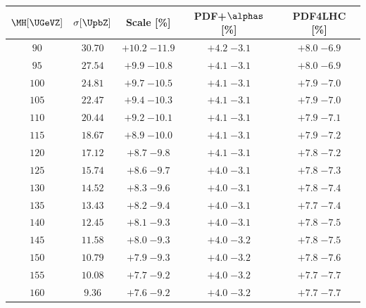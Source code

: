 \begin{table}

   \begin{center}
   \small
   \begin{tabular}{ccccc}
   \hline
   $\MH[\UGeVZ]$ & $\sigma[\UpbZ]$ & Scale [\%] & PDF+$\alphas$ [\%] & \small{PDF4LHC} [\%]\\
   \hline
 $ 90 $&$ 30.70 $& $ {+10.2}  \;{-11.9} $ & $ {+ 4.2}  \;{- 3.1} $ & $ {+ 8.0}  \;{- 6.9} $ \\
 $ 95 $&$ 27.54 $& $ {+ 9.9}  \;{-10.8} $ & $ {+ 4.1}  \;{- 3.1} $ & $ {+ 8.0}  \;{- 6.9} $ \\
 $100 $&$ 24.81 $& $ {+ 9.7}  \;{-10.5} $ & $ {+ 4.1}  \;{- 3.1} $ & $ {+ 7.9}  \;{- 7.0} $ \\
 $105 $&$ 22.47 $& $ {+ 9.4}  \;{-10.3} $ & $ {+ 4.1}  \;{- 3.1} $ & $ {+ 7.9}  \;{- 7.0} $ \\
 $110 $&$ 20.44 $& $ {+ 9.2}  \;{-10.1} $ & $ {+ 4.1}  \;{- 3.1} $ & $ {+ 7.9}  \;{- 7.1} $ \\
 $115 $&$ 18.67 $& $ {+ 8.9}  \;{-10.0} $ & $ {+ 4.1}  \;{- 3.1} $ & $ {+ 7.9}  \;{- 7.2} $ \\
 $120 $&$ 17.12 $& $ {+ 8.7}  \;{- 9.8} $ & $ {+ 4.1}  \;{- 3.1} $ & $ {+ 7.8}  \;{- 7.2} $ \\
 $125 $&$ 15.74 $& $ {+ 8.6}  \;{- 9.7} $ & $ {+ 4.0}  \;{- 3.1} $ & $ {+ 7.8}  \;{- 7.3} $ \\
 $130 $&$ 14.52 $& $ {+ 8.3}  \;{- 9.6} $ & $ {+ 4.0}  \;{- 3.1} $ & $ {+ 7.8}  \;{- 7.4} $ \\
 $135 $&$ 13.43 $& $ {+ 8.2}  \;{- 9.4} $ & $ {+ 4.0}  \;{- 3.1} $ & $ {+ 7.7}  \;{- 7.4} $ \\
 $140 $&$ 12.45 $& $ {+ 8.1}  \;{- 9.3} $ & $ {+ 4.0}  \;{- 3.1} $ & $ {+ 7.8}  \;{- 7.5} $ \\
 $145 $&$ 11.58 $& $ {+ 8.0}  \;{- 9.3} $ & $ {+ 4.0}  \;{- 3.2} $ & $ {+ 7.8}  \;{- 7.5} $ \\
 $150 $&$ 10.79 $& $ {+ 7.9}  \;{- 9.3} $ & $ {+ 4.0}  \;{- 3.2} $ & $ {+ 7.8}  \;{- 7.6} $ \\
 $155 $&$ 10.08 $& $ {+ 7.7}  \;{- 9.2} $ & $ {+ 4.0}  \;{- 3.2} $ & $ {+ 7.7}  \;{- 7.7} $ \\
 $160 $&$  9.36 $& $ {+ 7.6}  \;{- 9.2} $ & $ {+ 4.0}  \;{- 3.2} $ & $ {+ 7.7}  \;{- 7.7} $ \\

\end{tabular}
\end{center}
\end{table}
